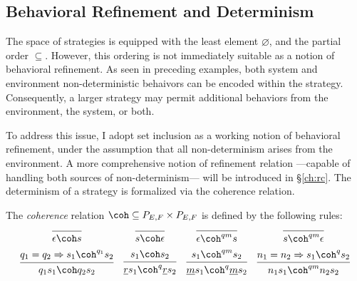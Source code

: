 \subsection{Behavioral Refinement and Determinism}

The space of strategies
is equipped with the least element $\varnothing$,
and the partial order $\subseteq$.
However,
this ordering is not immediately
suitable as a notion of behavioral refinement.
As seen in preceding examples,
both system and environment non-deterministic behaivors
can be encoded within the strategy.
Consequently,
a larger strategy
may permit
additional behaviors from the environment, the system, or both.

To address this issue,
I adopt set inclusion
as a working notion of behavioral refinement,
under the assumption that
all non-determinism arises from the environment.
A more comprehensive notion of refinement relation%
---capable of handling both sources of non-determinism---
will be introduced in \S\ref{ch:rc}.
The determinism of a strategy
is formalized via the coherence relation.
\begin{definition}[Coherence]
  The \emph{coherence} relation ${\coh} \subseteq P_{E,F} \times P_{E,F}$
  is defined by the following rules:
  \[
    \begin{array}{cccc}
      \begin{prooftree}
        \infer0{\epsilon \coh s}
      \end{prooftree}
      &
      \begin{prooftree}
        \infer0{s \coh \epsilon}
      \end{prooftree}
      &
      \begin{prooftree}
        \infer0{\epsilon \coh^{qm} s}
      \end{prooftree}
      &
      \begin{prooftree}
        \infer0{s \coh^{qm} \epsilon}
      \end{prooftree}
      \\[2ex]
      \begin{prooftree}
        \hypo{q_1 = q_2 \Rightarrow s_1 \coh^{q_1} s_2}
        \infer1{q_1 s_1 \coh q_2 s_2}
      \end{prooftree}
      &
      \begin{prooftree}
        \hypo{s_1 \coh s_2}
        \infer1{\underline{r} s_1 \coh^q \underline{r} s_2}
      \end{prooftree}
      &
      \begin{prooftree}
        \hypo{s_1 \coh^{qm} s_2}
        \infer1{\underline{m} s_1 \coh^q \underline{m} s_2}
      \end{prooftree}
      &
      \begin{prooftree}
        \hypo{n_1 = n_2 \Rightarrow s_1 \coh^q s_2}
        \infer1{n_1 s_1 \coh^{qm} n_2 s_2}
      \end{prooftree}
    \end{array}
  \]
\end{definition}
